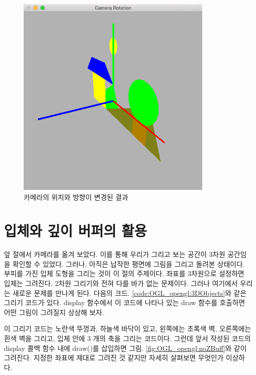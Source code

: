 \begin{figure}[h!]
  \centering
    \includegraphics[height=10cm]{OGL_opengl/camMove.png}
    \caption{카메라의 위치와 방향이 변경된 결과}
    \label{fig:OGL_opengl:camMove}
\end{figure}

\section{입체와 깊이 버퍼의 활용}

앞 절에서 카메라를 옮겨 보았다. 이를 통해 우리가 그리고 보는 공간이 3차원 공간임을 확인할 수 있었다. 그러나, 아직은 납작한 평면에 그림을 그리고 돌려본 상태이다. 부피를 가진 입체 도형을 그리는 것이 이 절의 주제이다.
좌표를 3차원으로 설정하면 입체는 그려진다. 2차원 그리기와 전혀 다를 바가 없는 문제이다. 그러나 여기에서 우리는 새로운 문제를 만나게 된다.
다음의 크드. \ref{code:OGL_opengl:3DObjects}와 같은 그리기 코드가 있다. {\sf display} 함수에서 
이 코드에 나타나 있는 {\sf draw} 함수를 호출하면 어떤 그림이 그려질지 상상해 보자.


이 그리기 코드는 노란색 뚜껑과, 하늘색 바닥이 있고, 왼쪽에는 초록색 벽, 오른쪽에는 흰색 벽을 그리고, 입체 안에 3 개의 축을 그리는 코드이다. 그런데 앞서 작성된 코드의 {\sf display} 콜백 함수 내에 {\sf draw()}를 삽입하면 그림. \ref{fig:OGL_opengl:noZBuff}와 같이 그려진다.
지정한 좌표에 제대로 그려진 것 같지만 자세히 살펴보면 무엇인가 이상하다.

